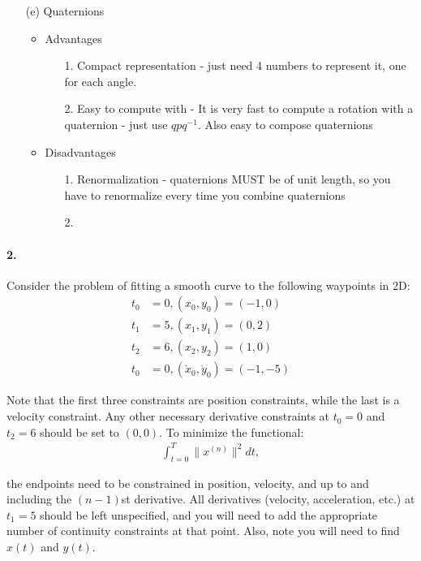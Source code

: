 \documentclass[english]{article}
\begin{document}
\begin{enumerate}
 \item[(e)] Quaternions 
    \begin{itemize}
     \item Advantages
     \begin{enumerate}
      \item[1.] Compact representation - just need 4 numbers to represent it, one for each angle.
      \item[2.] Easy to compute with - It is very fast to compute a rotation with a quaternion - just use $qpq^{-1}$. Also easy to compose quaternions
     \end{enumerate}
     \item Disadvantages
     \begin{enumerate}
      \item[1.] Renormalization - quaternions MUST be of unit length, so you have to renormalize every time you combine quaternions
      \item[2.] 
     \end{enumerate}
    \end{itemize}

\end{enumerate}



\paragraph{2.}  
Consider the problem of fitting a smooth curve to the following waypoints in 2D: 
\begin{align*}
t_0 &= 0, (x_0, y_0) = (-1, 0) \\
t_1 &= 5, (x_1, y_1) = (0, 2) \\
t_2 &= 6, (x_2, y_2) = (1, 0) \\
t_0 &= 0, (\dot{x}_0, \dot{y}_0) = (-1, -5) 
\end{align*}

Note that the first three constraints are position constraints, while the last is a velocity constraint. Any other necessary derivative constraints at $t_0 = 0$ and $t_2 = 6$ should be set to $(0, 0)$. To minimize the functional:
\begin{align}
\int_{t = 0}^T \| x^{(n)} \|^2 dt,
\end{align}

\noindent the endpoints need to be constrained in position, velocity, and up to and including the $(n-1)$st derivative. All derivatives (velocity, acceleration, etc.) at $t_1 = 5$ should be left unspecified, and you will need to add the appropriate number of continuity constraints at that point. Also, note you will need to find $x(t)$ and $y(t)$.
\end{document}
